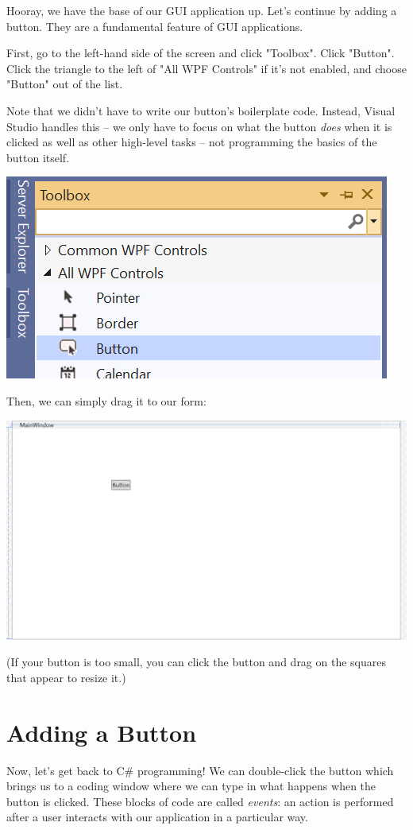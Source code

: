 \documentclass[oneside, openany] {book}
\begin{document}
Hooray, we have the base of our GUI application up. Let's continue by adding a button. They are a fundamental feature of GUI applications.

First, go to the left-hand side of the screen and click "Toolbox". Click "Button". Click the triangle to the left of "All WPF Controls" if it's not enabled, and choose "Button" out of the list.

Note that we didn't have to write our button's boilerplate code. Instead, Visual Studio handles this -- we only have to focus on what the button \emph{does} when it is clicked as well as other high-level tasks -- not programming the basics of the button itself.


\includegraphics[scale = 1]{FindingButton}

Then, we can simply drag it to our form:

\includegraphics[scale = 0.5]{FormWithButton}

(If your button is too small, you can click the button and drag on the squares that appear to resize it.)
\section{Adding a Button}
Now, let's get back to C\# programming! We can double-click the button which brings us to a coding window where we can type in what happens when the button is clicked. These blocks of code are called \emph{events}: an action is performed after a user interacts with our application in a particular way.
\end{document}
